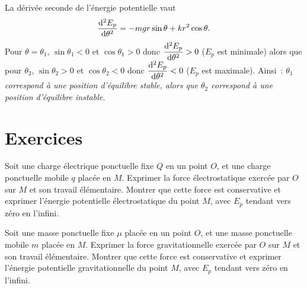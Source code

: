 La dérivée seconde de l'énergie potentielle vaut
\begin{equation}
  \dfrac{\mathrm{d}^2 E_p}{\mathrm{d} {\theta}^2} = -mgr\sin\theta +kr^2\cos\theta.
\end{equation}
Pour \(\theta=\theta_1\), \(\sin\theta_1<0\) et \(\cos\theta_1>0\) donc \(\dfrac{\mathrm{d}^2 E_p}{\mathrm{d} {\theta}^2}>0\) ($E_p$ est minimale) alors que pour \(\theta_2\), \(\sin\theta_2>0\) et \(\cos\theta_2<0\) donc \(\dfrac{\mathrm{d}^2 E_p}{\mathrm{d} {\theta}^2}<0\) ($E_p$ est maximale). Ainsi~: \emph{$\theta_1$ correspond à une position d'équilibre stable, alors que \(\theta_2\) correspond à une position d'équilibre instable.}
\section{Exercices}
\label{chap4-sec:exercices}
\begin{exercice}
  Soit une charge électrique ponctuelle fixe \(Q\) en un point \(O\), et une charge ponctuelle mobile \(q\) placée en \(M\). Exprimer la force électrostatique exercée par \(O\) sur \(M\) et son travail élémentaire. Montrer que cette force est conservative et exprimer l'énergie potentielle électrostatique du point \(M\), avec \(E_p\) tendant vers zéro en l'infini.
\end{exercice}
%
\begin{exercice}
  Soit une masse ponctuelle fixe \(\mu\) placée en un point \(O\), et une masse ponctuelle mobile \(m\) placée en \(M\). Exprimer la force gravitationnelle exercée par \(O\) sur \(M\) et son travail élémentaire. Montrer que cette force est conservative et exprimer l'énergie potentielle gravitationnelle du point \(M\), avec \(E_p\) tendant vers zéro en l'infini.
\end{exercice}
%
